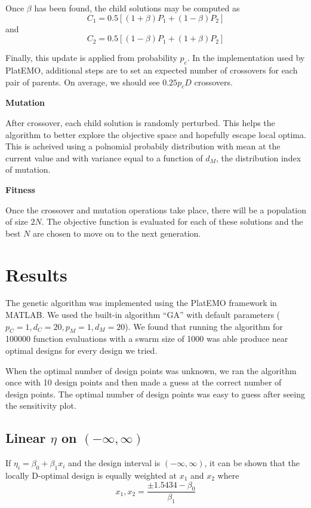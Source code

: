 \documentclass[11pt,a4paper]{article}
\begin{document}
Once $\beta$ has been found, the child solutions may be computed as
$$
C_1 = 0.5\left[(1+\beta)P_1 + (1-\beta)P_2 \right]
$$
and 
$$
C_2 = 0.5\left[(1-\beta)P_1 + (1+\beta)P_2 \right]
$$

Finally, this update is applied from probability $p_c$. In the implementation used by PlatEMO, additional steps are to set an expected number of crossovers for each pair of parents. On average, we should see $0.25 p_cD$ crossovers.

\begin{flushleft}
\textbf{Mutation}
\end{flushleft}
After crossover, each child solution is randomly perturbed. This helps the algorithm to better explore the objective space and hopefully escape local optima. This is acheived using a polnomial probabily distribution with mean at the current value and with variance equal to a function of $d_M$, the distribution index of mutation.



\begin{flushleft}
\textbf{Fitness}
\end{flushleft}
Once the crossover and mutation operations take place, there will be a population of size $2N$. The objective function is evaluated for each of these solutions and the best $N$ are chosen to move on to the next generation.



\section{Results}
The genetic algorithm was implemented using the PlatEMO framework in MATLAB. We used the built-in algorithm ``GA'' with default parameters ($p_C = 1, d_C = 20, p_M = 1, d_M = 20$). We found that running the algorithm for 100000 function evaluations with a swarm size of 1000 was able produce near optimal designs for every design we tried. 

When the optimal number of design points was unknown, we ran the algorithm once with 10 design points and then made a guess at the correct number of design points. The optimal number of design points was easy to guess after seeing the sensitivity plot.

\subsection{Linear $\eta$ on $(-\infty, \infty)$}
If $\eta_i = \beta_0 + \beta_1 x_i$ and the design interval is $(-\infty, \infty)$, it can be shown that the locally D-optimal design is equally weighted at $x_1$ and $x_2$ where
$$
x_1, x_2 = \frac{\pm 1.5434 - \beta_0}{\beta_1}
$$
\end{document}
